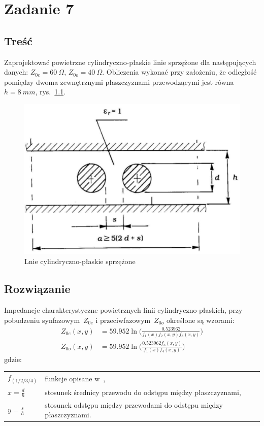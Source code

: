 \documentclass[rep.tex]{subfiles}
\begin{document}
\chapter{Zadanie 7}
\label{zad7}
\section{Treść}
Zaprojektować powietrzne cylindryczno-płaskie linie sprzężone dla następujących danych:
$Z_{0e} = 60~\Omega$, $Z_{0o} = 40~\Omega$.
Obliczenia wykonać przy założeniu,
że odległość pomiędzy dwoma zewnętrznymi płaszczyznami przewodzącymi jest równa~$h = 8~mm$, rys.~\ref{fig:zad7:cf}.

\begin{figure}[!htbp]
  \centering
  \includegraphics[scale=0.5]{fig/zad7/cf}
  \caption{Lnie cylindryczno-płaskie sprzężone}
  \label{fig:zad7:cf}
\end{figure}

\section{Rozwiązanie}
Impedancje charakterystyczne powietrznych linii cylindryczno-płaskich,
przy pobudzeniu synfazowym~$Z_{0e}$ i przeciwfazowym~$Z_{0o}$ określone są wzorami:
\begin{align}
  Z_{0e}(x, y) &= 59.952 \ln \Bigg( \frac{0.523962}{f_1(x) f_2(x, y) f_3(x, y)} \Bigg) \\
  Z_{0o}(x, y) &= 59.952 \ln \Bigg( \frac{0.523962 f_3(x, y)}{f_1(x) f_4(x, y)} \Bigg)
\end{align}
gdzie:\\
\begin{tabular}{l @{ - } l}
  $f_{(1/2/3/4)}$ & funkcje opisane w~\cite{obwody}, \\
  $x = \frac{d}{h}$ & stosunek średnicy przewodu do odstępu między płaszczyznami, \\
  $y = \frac{s}{h}$ & stosunek odstępu między przewodami do odstępu między płaszczyznami. \\
\end{tabular}
\end{document}
